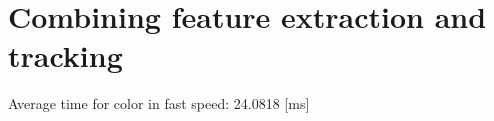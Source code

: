

\chapter{Combining feature extraction and tracking} %
\label{chap:combining_feature_extraction_and_tracking}

	\ifx \plots \yes
	\fi

Average time for color in fast speed: 24.0818 [ms]

